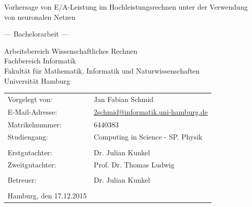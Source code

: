 \documentclass[
	twoside,
	12pt,
	a4paper,
	BCOR10mm,
	DIV14,
	listof=totoc,
	bibliography=totoc,
	headsepline
]{scrreprt}
\begin{document}
	

\begin{titlepage}
	\begin{center}
		{\titlefont\huge Vorhersage von E/A-Leistung im Hochleistungsrechnen unter der Verwendung von neuronalen Netzen\par}

		\bigskip
		\bigskip

		{\titlefont\Large --- Bachelorarbeit ---\par}

		\bigskip
		\bigskip

		{\large Arbeitsbereich Wissenschaftliches Rechnen\\
		Fachbereich Informatik\\
		Fakultät für Mathematik, Informatik und Naturwissenschaften\\
		Universität Hamburg\par}
	\end{center}

	\vfill

	{\large \begin{tabular}{ll}
		Vorgelegt von: & Jan Fabian Schmid \\
		E-Mail-Adresse: & \href{mailto:2schmid@informatik.uni-hamburg.de}{2schmid@informatik.uni-hamburg.de} \\
		Matrikelnummer: & 6440383 \\
		Studiengang: & Computing in Science - SP. Physik \\
		\\
		Erstgutachter: & Dr. Julian Kunkel \\
		Zweitgutachter: & Prof. Dr. Thomas Ludwig\\ \\
		Betreuer: & Dr. Julian Kunkel \\
		\\
		Hamburg, den 17.12.2015
	\end{tabular}\par}
\end{titlepage}

\cleardoublepage
\end{document}
